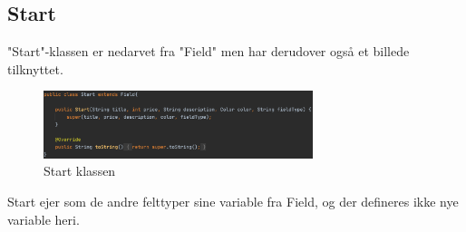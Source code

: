 \subsection{Start}
"Start"-klassen er nedarvet fra "Field" men har derudover også et billede tilknyttet.

\begin{figure}[H]
    \centering
    \includegraphics[width=0.7\textwidth]{sources/7_implementering/StartKlasse.png}
    \caption{Start klassen}
    \label{fig:Startklasse}
\end{figure}
Start ejer som de andre felttyper sine variable fra Field, og der defineres ikke nye variable heri.